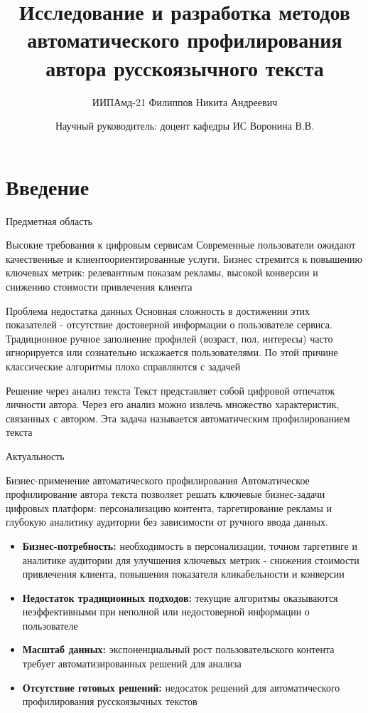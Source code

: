 \documentclass[10pt]{beamer}
\title{Исследование и разработка методов автоматического профилирования автора русскоязычного текста}
\author{ИИПАмд-21 Филиппов Никита Андреевич}
\date{Научный руководитель: доцент кафедры ИС Воронина В.В. }
\begin{document}
\begin{frame}
\titlepage
\end{frame}

\section{Введение}

\begin{frame}{Предметная область}
\begin{block}{Высокие требования к цифровым сервисам}
Современные пользователи ожидают качественные и клиентоориентированные услуги. Бизнес стремится к повышению ключевых метрик: релевантным показам рекламы, высокой конверсии и снижению стоимости привлечения клиента
\end{block}

\begin{block}{Проблема недостатка данных}
Основная сложность в достижении этих показателей - отсутствие достоверной информации о пользователе сервиса. Традиционное ручное заполнение профилей (возраст, пол, интересы) часто игнорируется или сознательно искажается пользователями. По этой причине классические алгоритмы плохо справляются с задачей
\end{block}

\begin{block}{Решение через анализ текста}
Текст представляет собой цифровой отпечаток личности автора. Через его анализ можно извлечь множество характеристик, связанных с автором. Эта задача называется автоматическим профилированием текста
\end{block}
\end{frame}

\begin{frame}{Актуальность}
\begin{block}{Бизнес-применение автоматического профилирования}
Автоматическое профилирование автора текста позволяет решать ключевые бизнес-задачи цифровых платформ: персонализацию контента, таргетирование рекламы и глубокую аналитику аудитории без зависимости от ручного ввода данных.
\end{block}

\begin{itemize}
\item \textbf{Бизнес-потребность:} необходимость в персонализации, точном таргетинге и аналитике аудитории для улучшения ключевых метрик - снижения стоимости привлечения клиента, повышения показателя кликабельности и конверсии

\item \textbf{Недостаток традиционных подходов:} текущие алгоритмы оказываются неэффективными при неполной или недостоверной информации о пользователе

\item \textbf{Масштаб данных:} экспоненциальный рост пользовательского контента требует автоматизированных решений для анализа

\item \textbf{Отсутствие готовых решений:} недосаток решений для автоматического профилирования русскоязычных текстов
\end{itemize}
\end{frame}
\end{document}
